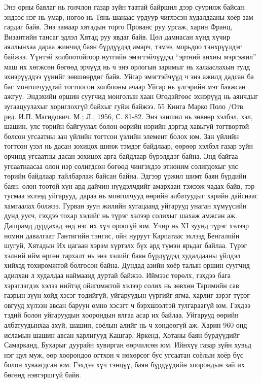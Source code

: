 Энэ орны баялаг нь голчлон газар зүйн таатай байршил дээр суурилж байсан: эндээс нэг нь умар, нөгөө нь Тянь-шанаас урдуур чиглэсэн худалдааны хоёр зам гардаг байв. Энэ замаар хятадын торго Прованс руу урсаж, харин Франц, Византийн тансаг эдлэл Хятад руу явдаг байв. Цөл дамнасан хүнд хүчир аяллынхаа дараа жинчид баян бүрдүүдэд амарч, тэмээ, морьдоо тэнхрүүлдэг байжээ. Үүнтэй холбоотойгоор нутгийн эмэгтэйчүүдэд “эртний анхны мэргэжил” маш их хөгжсөн бөгөөд эрчүүд нь ч энэ орлогын заримыг нь халааслахын тулд эхнэрүүддээ үүнийг зөвшөөрдөг байв. Уйгар эмэгтэйчүүд ч энэ ажилд дадсан ба бас монголчуудтай тогтоосон холбооны ачаар Уйгар нь үлгэрийн мэт баяжсан ажгуу. Эндэхийн оршин суугчид монголын хаан Өгөдэйгөөс эхнэрүүд нь аянчдыг зугаацуулахыг хориглохгүй байхыг гуйж байжээ.
55 Книга Марко Поло /Отв. ред. И.П. Магидович. М.; Л., 1956, С. 81-82.
Энэ заншил нь зөвөөр хэлбэл, хэл, шашин, улс төрийн байгуулал болон өөрийн нэрийн дэргэд хавьгүй тогтвортой болсон угсаатны зан үйлийн тогтсон үзлийн элемент болох юм. Зан үйлийн тогтсон үзэл нь дасан зохицох шинж тэмдэг байдлаар, өөрөөр хэлбэл газар зүйн орчинд угсаатны дасан зохицох арга байдлаар бүрэлддэг байна. Энд байгаа угсаатнаасаа олон нэр солигдсон бөгөөд чингэхдээ этноним солигдохыг улс төрийн байдлаар тайлбарлаж байсан байна.
Эдгээр үржил шимт баян бүрдийн баян, олон тоотой хүн ард дайчин нүүдэлчдийг амархаан тэжээж чадах байв, тэр тусмаа эхлээд уйгарууд, дараа нь монголчууд өөрийн албатуудыг харийн дайснаас хамгаалах болжээ. Гурван зуун жилийн хугацаанд уйгарууд унаган хүмүүсийн дунд уусч, гэхдээ тохар хэлийг нь түрэг хэлээр солихыг шахаж амжсан аж. Дашрамд дурдахад энд нэг их хүч ороогүй юм. Учир нь XI зуунд түрэг хэлээр номин давалгаат Гантигийн тэнгис, ойн нуруут Карпатаас эхлээд Бенгалийн шугуй, Хятадын Их цагаан хэрэм хүртэлх бүх ард түмэн ярьдаг байлаа. Түрэг хэлний ийм өргөн тархалт нь энэ хэлийг баян бүрдүүдэд худалдааны үйлдэл хийхэд тохиромжтой болгосон байна. Дундад азийн хоёр талын оршин суугчид адилхан л худалдаа наймаанд дуртай байжээ. Иймээс төрөлх, гэхдээ бага хэрэглэгдэх хэлээ нийтэд ойлгомжтой хэлээр солих нь зөвхөн Таримийн сав газрын зүүн хойд хэсэг төдийгүй, уйгаруудын үүргийг ягма, харлиг зэрэг түрэг овгууд хүлээн авсан баруун өмнө хэсэгт ч бэрхшээлтэй тулгараагүй юм. Гэхдээ тэдий болон уйгаруудын хоорондын ялгаа асар их байлаа. Уйгарууд өөрийн албатуудынхаа ахуй, шашин, соёлын алийг нь ч хөндөөгүй аж. Харин 960 онд исламын шашин авсан харлигууд Кашгар, Яркенд, Хотаны баян бүрдүүдийг Самарканд, Бухарыг дуурайн хувирган өөрчилсөн юм. Ийнхүү газар зүйн хувьд нэг цул муж, өөр хоорондоо огтхон ч нөхөрсөг бус угсаатан соёлын хоёр бүс болон хуваагдсан юм. Гэхдээ хүч тэнцүү, баян бүрдүүдийн хоорондын зай их бөгөөд нэвтэршгүй байв.
